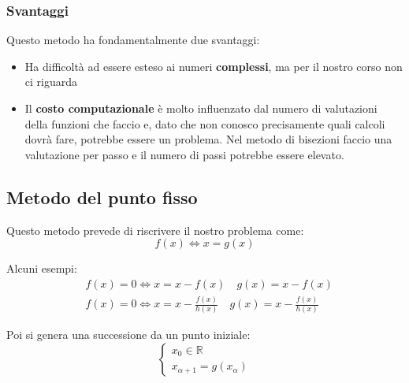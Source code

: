 \subsubsection{Svantaggi}
Questo metodo ha fondamentalmente due svantaggi:
\begin{itemize}
	\item Ha difficoltà ad essere esteso ai numeri \textbf{complessi}, ma per il nostro corso non ci riguarda
	\item Il \textbf{costo computazionale} è molto influenzato dal numero di valutazioni della funzioni che faccio e, dato che non conosco precisamente quali calcoli dovrà fare, potrebbe essere un problema. Nel metodo di bisezioni faccio una valutazione per passo e il numero di passi potrebbe essere elevato.
\end{itemize} 

\subsection{Metodo del punto fisso}
Questo metodo prevede di riscrivere il nostro problema come:
\begin{equation*}
	f(x) \Longleftrightarrow x = g(x)
\end{equation*}
\begin{example}
	Alcuni esempi:
	\begin{align*}
		&f(x)=0 \Longleftrightarrow x = x-f(x) \quad g(x) = x-f(x)\\
		& f(x)=0 \Longleftrightarrow x=x-\frac{f(x)}{h(x)} \quad g(x)=x-\frac{f(x)}{h(x)}
	\end{align*}
\end{example}
Poi si genera una successione da un punto iniziale:
\begin{equation*}
	\begin{cases}
		x_0 \in \mathbb{R} \\
		x_{\alpha +1} = g(x_\alpha)
	\end{cases}
\end{equation*}

